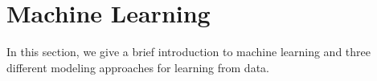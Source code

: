 
\section{Machine Learning} 
\label{sec:machine_learning}

In this section, we give a brief introduction to machine learning and three different modeling approaches for learning from data.  
